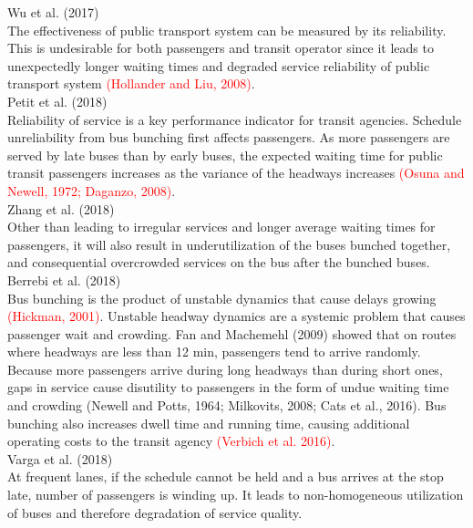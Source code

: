 \documentclass{article}
\begin{document}
\noindent \textrm{Wu et al. (2017)}\\
The effectiveness of public transport system can be measured by its reliability.
This is undesirable for both passengers and transit operator 
since it leads to unexpectedly longer waiting times and degraded service reliability of public transport system 
\textcolor{red}{\textrm{(Hollander and Liu, 2008)}}.\\

\noindent \textrm{Petit et al. (2018)}\\
Reliability of service is a key performance indicator for transit agencies.
Schedule unreliability from bus bunching first affects passengers. 
As more passengers are served by late buses than by early buses, 
the expected waiting time for public transit passengers increases as the variance of the headways increases
\textcolor{red}{\textrm{(Osuna and Newell, 1972; Daganzo, 2008)}}.\\

\noindent \textrm{Zhang et al. (2018)}\\
Other than leading to irregular services and longer average waiting times for passengers, 
it will also result in underutilization of the buses bunched together, 
and consequential overcrowded services on the bus after the bunched buses.\\

\noindent \textrm{Berrebi et al. (2018)}\\
Bus bunching is the product of unstable dynamics that cause delays growing 
\textcolor{red}{\textrm{(Hickman, 2001)}}.
Unstable headway dynamics are a systemic problem that causes passenger wait and crowding.
\textrm{Fan and Machemehl (2009)} showed that on routes 
where headways are less than 12 min, 
passengers tend to arrive randomly.
Because more passengers arrive during long headways than during short ones, 
gaps in service cause disutility to passengers in the form of undue waiting time and crowding 
\textrm{(Newell and Potts, 1964; Milkovits, 2008; Cats et al., 2016)}.
Bus bunching also increases dwell time and running time, 
causing additional operating costs to the transit agency 
\textcolor{red}{\textrm{(Verbich et al. 2016)}}.\\

\noindent \textrm{Varga et al. (2018)}\\
At frequent lanes, 
if the schedule cannot be held and a bus arrives at the stop late, 
number of passengers is winding up.
It leads to non-homogeneous utilization of buses 
and therefore degradation of service quality.\\
\end{document}
